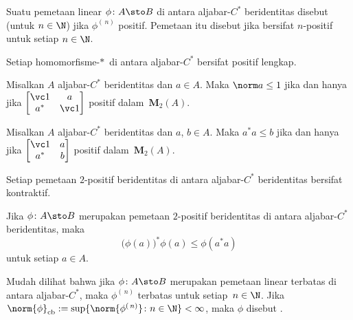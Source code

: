 \begin{defn} Suatu pemetaan linear $\phi\colon A \sto B$ di antara aljabar-$C^*$ beridentitas disebut
 (untuk $n \in \N$) jika $\phi^{(\,n)}$ positif. Pemetaan itu disebut
 jika bersifat $n$-positif untuk setiap $n \in \N$.
\end{defn}

\begin{exam} Setiap homomorfisme-$*\,$ di antara aljabar-$C^*$ bersifat positif lengkap.
\end{exam}

\begin{prop}\label{00582811} Misalkan $A$ aljabar-$C^*$ beridentitas dan $a \in A$. Maka $\norm a \le 1$ jika dan hanya jika
$\begin{bmatrix} \vc 1 & a \\ a^* & \vc 1 \end{bmatrix}$ positif dalam~$\mathbf M_2(A)$.
\end{prop}

\begin{prop} Misalkan $A$ aljabar-$C^*$ beridentitas dan $a$, $b \in A$. Maka $a^*a \le b$ jika
dan hanya jika $\begin{bmatrix} \vc 1 & a \\ a^* & b \end{bmatrix}$ positif dalam~$\mathbf
M_2(A)$.
\end{prop}

\begin{prop} Setiap pemetaan $2$-positif beridentitas di antara aljabar-$C^*$ beridentitas bersifat kontraktif.
\end{prop}

\begin{prop}\label{0058283} Jika $\phi\colon A \sto B$ merupakan pemetaan
$2$-positif beridentitas
di antara aljabar-$C^*$ beridentitas, maka
   \[ \bigl(\phi(a)\bigr)^*\phi(a) \le \phi(a^*a) \]
untuk setiap $a \in A$.
\end{prop}

\begin{defn} Mudah dilihat bahwa jika $\phi\colon A \sto B$ merupakan pemetaan linear terbatas
di antara aljabar-$C^*$, maka $\phi^{(\,n)}$ terbatas untuk setiap~$n \in \N$. Jika
$\norm{\phi}_{\mathrm{cb}} := \sup\{\norm{\phi^{(\,n)}} \colon n \in \N\} < \infty$, maka
$\phi$ disebut
.
\end{defn}

